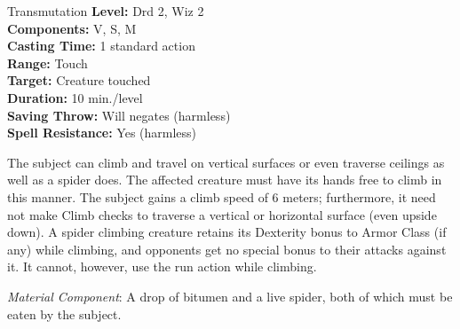 {Transmutation}
{
	\textbf{Level:}
	Drd 2, Wiz 2\\
	\textbf{Components:}
	V, S, M\\
	\textbf{Casting Time:}
	1 standard action\\
	\textbf{Range:}
	Touch\\
	\textbf{Target:}
	Creature touched\\
	\textbf{Duration:}
	10 min./level\\
	\textbf{Saving Throw:}
	Will negates (harmless)\\
	\textbf{Spell Resistance:}
	Yes (harmless)\\
}
{
	The subject can climb and travel on vertical surfaces or even traverse ceilings as well as a spider does. The affected creature must have its hands free to climb in this manner. The subject gains a climb speed of 6 meters; furthermore, it need not make Climb checks to traverse a vertical or horizontal surface (even upside down). A spider climbing creature retains its Dexterity bonus to Armor Class (if any) while climbing, and opponents get no special bonus to their attacks against it. It cannot, however, use the run action while climbing.

	\textit{Material Component}:
	A drop of bitumen and a live spider, both of which must be eaten by the subject.

}

